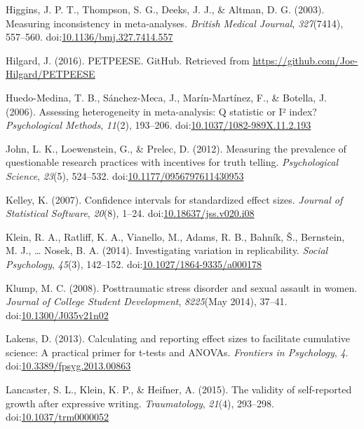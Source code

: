 \documentclass[english,man, mask]{apa6}
\theoremstyle{definition}
\theoremstyle{definition}
\theoremstyle{definition}
\theoremstyle{remark}
\begin{document}
\hypertarget{ref-Higgins2003}{}
Higgins, J. P. T., Thompson, S. G., Deeks, J. J., \& Altman, D. G.
(2003). Measuring inconsistency in meta-analyses. \emph{British Medical
Journal}, \emph{327}(7414), 557--560.
doi:\href{https://doi.org/10.1136/bmj.327.7414.557}{10.1136/bmj.327.7414.557}

\hypertarget{ref-Hilgard2016}{}
Hilgard, J. (2016). PETPEESE. GitHub. Retrieved from
\url{https://github.com/Joe-Hilgard/PETPEESE}

\hypertarget{ref-Huedo-Medina2006}{}
Huedo-Medina, T. B., Sánchez-Meca, J., Marín-Martínez, F., \& Botella,
J. (2006). Assessing heterogeneity in meta-analysis: Q statistic or I²
index? \emph{Psychological Methods}, \emph{11}(2), 193--206.
doi:\href{https://doi.org/10.1037/1082-989X.11.2.193}{10.1037/1082-989X.11.2.193}

\hypertarget{ref-John2012}{}
John, L. K., Loewenstein, G., \& Prelec, D. (2012). Measuring the
prevalence of questionable research practices with incentives for truth
telling. \emph{Psychological Science}, \emph{23}(5), 524--532.
doi:\href{https://doi.org/10.1177/0956797611430953}{10.1177/0956797611430953}

\hypertarget{ref-Kelley2007}{}
Kelley, K. (2007). Confidence intervals for standardized effect sizes.
\emph{Journal of Statistical Software}, \emph{20}(8), 1--24.
doi:\href{https://doi.org/10.18637/jss.v020.i08}{10.18637/jss.v020.i08}

\hypertarget{ref-Klein2014a}{}
Klein, R. A., Ratliff, K. A., Vianello, M., Adams, R. B., Bahník, Š.,
Bernstein, M. J., \ldots{} Nosek, B. A. (2014). Investigating variation
in replicability. \emph{Social Psychology}, \emph{45}(3), 142--152.
doi:\href{https://doi.org/10.1027/1864-9335/a000178}{10.1027/1864-9335/a000178}

\hypertarget{ref-Klump2008}{}
Klump, M. C. (2008). Posttraumatic stress disorder and sexual assault in
women. \emph{Journal of College Student Development}, \emph{8225}(May
2014), 37--41.
doi:\href{https://doi.org/10.1300/J035v21n02}{10.1300/J035v21n02}

\hypertarget{ref-Lakens2013}{}
Lakens, D. (2013). Calculating and reporting effect sizes to facilitate
cumulative science: A practical primer for t-tests and ANOVAs.
\emph{Frontiers in Psychology}, \emph{4}.
doi:\href{https://doi.org/10.3389/fpsyg.2013.00863}{10.3389/fpsyg.2013.00863}

\hypertarget{ref-Lancaster2015}{}
Lancaster, S. L., Klein, K. P., \& Heifner, A. (2015). The validity of
self-reported growth after expressive writing. \emph{Traumatology},
\emph{21}(4), 293--298.
doi:\href{https://doi.org/10.1037/trm0000052}{10.1037/trm0000052}
\end{document}

